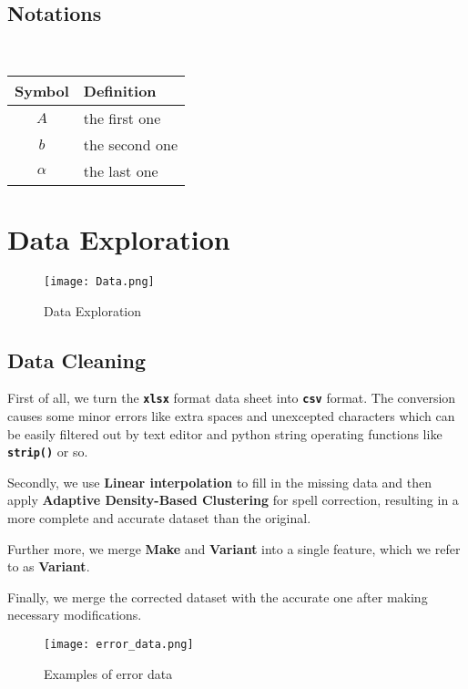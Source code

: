 \documentclass[12pt]{article}  %
\begin{document}
\subsection{Notations}
\ 
\begin{table}[!htbp]
\begin{center}
\begin{tabular}{cl}
	\toprule
	\multicolumn{1}{m{3cm}}{\centering Symbol}
	&\multicolumn{1}{m{8cm}}{\centering Definition}\\
	\midrule
	$A$&the first one\\
	$b$&the second one\\
	$\alpha$ &the last one\\
	\bottomrule
\end{tabular}
\end{center}
\end{table}
\section{Data Exploration}
\begin{figure}[htbp]
    \centering
    \texttt{[image: Data.png]}
    \caption{Data Exploration}\label{fig:Data}
\end{figure}

\subsection{Data Cleaning}
First of all, we turn the \textbf{\texttt{xlsx}} format data sheet into \textbf{\texttt{csv}} format. 
The conversion causes some minor errors like extra spaces and unexcepted characters which can be easily filtered out by text editor and python string operating functions like \textbf{\texttt{strip()}} or so.

Secondly, we use \textbf{Linear interpolation} to fill in the missing data and then apply \textbf{Adaptive Density-Based Clustering} for spell correction,
resulting in a more complete and accurate dataset than the original.

Further more, we merge \textbf{Make} and \textbf{Variant} into a single feature, which we refer to as \textbf{Variant}.

Finally, we merge the corrected dataset with the accurate one after making necessary modifications.
\begin{figure}[htbp]
    \centering
    \texttt{[image: error\_data.png]}
    \caption{Examples of error data}\label{fig:error_data}
\end{figure}
\end{document}
